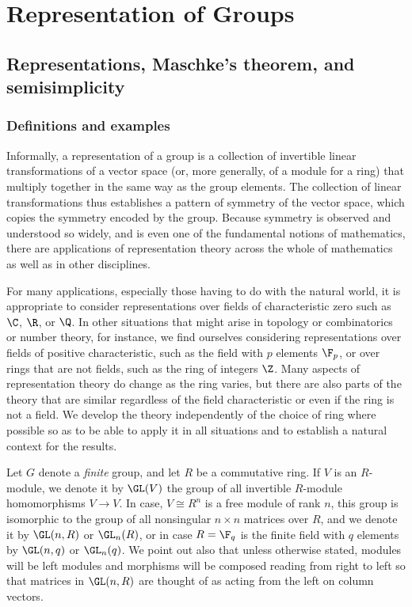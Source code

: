 
\chapter{Representation of Groups}
\section{Representations, Maschke's theorem, and semisimplicity}
\subsection{Definitions and examples}
Informally, a representation of a group is a collection of invertible linear transformations of a vector space (or, more generally, of a module for a ring) that multiply together in the same way as the group elements. The collection of linear transformations thus establishes a pattern of symmetry of the vector space, which copies the symmetry encoded by the group. Because symmetry is observed and understood so widely, and is even one of the fundamental notions of mathematics, there are applications of representation theory across the whole of mathematics as well as in other disciplines.\par
For many applications, especially those having to do with the natural world, it is appropriate to consider representations over fields of characteristic zero such as $\C$, $\R$, or $\Q$. In other situations that might arise in topology or combinatorics or number theory, for instance, we find ourselves considering representations over fields of positive characteristic, such as the field with $p$ elements $\F_p$, or over rings that are not fields, such as the ring of integers $\Z$. Many aspects of representation theory do change as the ring varies, but there are also parts of the theory that are similar regardless of the field characteristic or even if the ring is not a field. We develop the theory independently of the choice of ring where possible so as to be able to apply it in all situations and to establish a natural context for the results.\par
Let $G$ denote a \textit{finite} group, and let $R$ be a commutative ring. If $V$ is an $R$-module, we denote it by $\GL(V)$ the group of all invertible $R$-module homomorphisms $V\to V$. In case, $V\cong R^n$ is a free module of rank $n$, this group is isomorphic to the group of all nonsingular $n\times n$ matrices over $R$, and we denote it by $\GL(n,R)$ or $\GL_n(R)$, or in case $R=\F_q$ is the finite field with $q$ elements by $\GL(n,q)$ or $\GL_n(q)$. We point out also that unless otherwise stated, modules will be left modules and morphisms will be composed reading from right to left so that matrices in $\GL(n,R)$ are thought of as acting from the left on column vectors.\par
